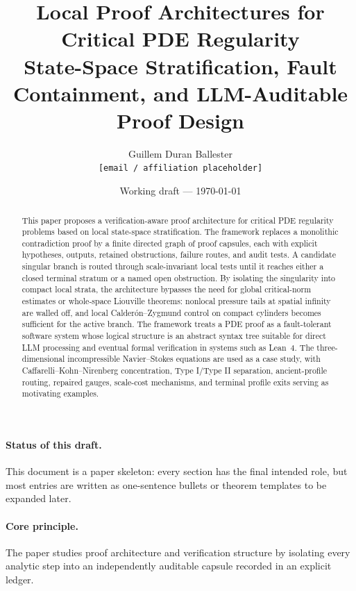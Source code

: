 \documentclass[11pt]{article}
\title{\textbf{Local Proof Architectures for Critical PDE Regularity}\\
\large State-Space Stratification, Fault Containment, and LLM-Auditable Proof Design}
\author{Guillem Duran Ballester\\
\small \texttt{[email / affiliation placeholder]}}
\date{Working draft --- \today}
\theoremstyle{plain}
\theoremstyle{definition}
\theoremstyle{remark}
\newcommand{\NS}{Navier--Stokes}
\begin{document}
\maketitle

\begin{abstract}
This paper proposes a verification-aware proof architecture for critical PDE regularity problems based on local state-space stratification.  The framework replaces a monolithic contradiction proof by a finite directed graph of proof capsules, each with explicit hypotheses, outputs, retained obstructions, failure routes, and audit tests.  A candidate singular branch is routed through scale-invariant local tests until it reaches either a closed terminal stratum or a named open obstruction.  By isolating the singularity into compact local strata, the architecture bypasses the need for global critical-norm estimates or whole-space Liouville theorems: nonlocal pressure tails at spatial infinity are walled off, and local Calder\'on--Zygmund control on compact cylinders becomes sufficient for the active branch.  The framework treats a PDE proof as a fault-tolerant software system whose logical structure is an abstract syntax tree suitable for direct LLM processing and eventual formal verification in systems such as Lean~4.  The three-dimensional incompressible \NS{} equations are used as a case study, with Caffarelli--Kohn--Nirenberg concentration, Type I/Type II separation, ancient-profile routing, repaired gauges, scale-cost mechanisms, and terminal profile exits serving as motivating examples.
\end{abstract}

\paragraph{Status of this draft.}
This document is a paper skeleton: every section has the final intended role, but most entries are written as one-sentence bullets or theorem templates to be expanded later.

\paragraph{Core principle.}
The paper studies proof architecture and verification structure by isolating every analytic step into an independently auditable capsule recorded in an explicit ledger.

\tableofcontents

\end{document}
